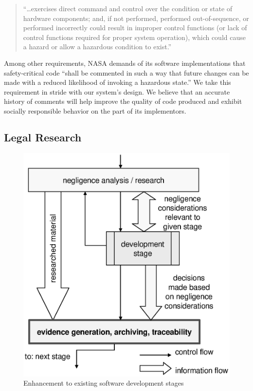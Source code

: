 \begin{quote} 
``\ldots exercises direct command and control over the condition or state of
hardware components; and, if not performed, performed out-of-sequence, or
performed incorrectly could result in improper control functions (or lack of
control functions required for proper system operation), which could cause a
hazard or allow a hazardous condition to exist.'' \cite{NASA1997}
\end{quote}

Among other requirements, NASA demands of its software implementations that
safety-critical code ``shall be commented in such a way that future changes can
be made with a reduced likelihood of invoking a hazardous state.'' We take this
requirement in stride with our system's design. We believe that an accurate
history of comments will help improve the quality of code produced and exhibit
socially responsible behavior on the part of its implementors.

\subsection{Legal Research}
\begin{figure}[t]
\begin{center}
\includegraphics{images/enhancement.eps}
\end{center}
\caption{Enhancement to existing software development stages}
\label{fig:enhancement}
\end{figure}

